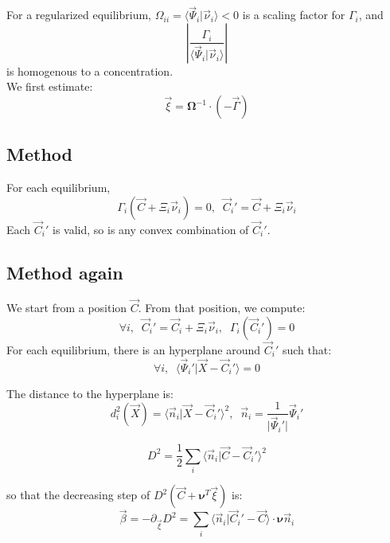 \documentclass[aps,12pt]{revtex4}
\begin{document}
For a regularized equilibrium, $\Omega_{ii}=\langle \vec{\Psi}_i \vert \vec{\nu}_i \rangle < 0$ is
a scaling factor for $\Gamma_i$, and
\begin{equation}
	\left\vert \dfrac{\Gamma_i}{\langle \vec{\Psi}_i \vert \vec{\nu}_i \rangle} \right\vert
\end{equation}
is homogenous to a concentration.\\
We first estimate:
\begin{equation}
	\vec{\xi} =  {\bm{\Omega}}^{-1} \cdot (-\vec{\Gamma} )
\end{equation}

\subsection{Method}

For each equilibrium,
\begin{equation}
	\Gamma_i(\vec{C}+\Xi_i \vec{\nu}_i) = 0,\;\; \vec{C}_i' = \vec{C}+\Xi_i \vec{\nu}_i
\end{equation}
Each $\vec{C}_i'$ is valid, so is any convex combination of $\vec{C}_i'$.
  
  
\subsection{Method again}
We start from a position $\vec{C}$.
From that position, we compute:
\begin{equation}
	\forall i, \;\;\vec{C}_i' = \vec{C}_i + \Xi_i \vec{\nu}_i,\;\;\Gamma_i(\vec{C}_i') = 0
\end{equation}
For each equilibrium, there is an hyperplane around $\vec{C}_i'$ such that:
\begin{equation}
	\forall i, \;\; \langle \vec{\Psi}_i' \vert \vec{X} - \vec{C}_i'\rangle = 0
\end{equation} 
  
 The distance to the hyperplane is:
 \begin{equation}
 	d_i^2(\vec{X}) = \langle \vec{n}_i \vert \vec{X} - \vec{C}_i'\rangle^2,\;\; \vec{n}_i = \dfrac{1}{\vert  \vec{\Psi}_i' \vert} \vec{\Psi}_i'
 \end{equation} 

\begin{equation}
	D^2 = \dfrac{1}{2} \sum_i   \langle \vec{n}_i \vert \vec{C} - \vec{C}_i'\rangle^2
\end{equation}

so that the decreasing step of $D^2(\vec{C} + \bm{\nu}^T \vec{\xi})$ is:
\begin{equation}
	\vec{\beta} = -\partial_{\vec{\xi}} D^2 = \sum_i \langle \vec{n}_i \vert  \vec{C}_i' - \vec{C}\rangle 
	\cdot \bm{\nu} \vec{n}_i
\end{equation}


 
\end{document}
